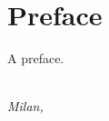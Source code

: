 \chapter*{Preface}

A preface.

\begin{flushright}
{\makeatletter\itshape
    \ifdefvoid{\@author@short}{\@author}{\@author@short} \\
    Milan, \monthname{} \the\year{}
\makeatother}
\end{flushright}
